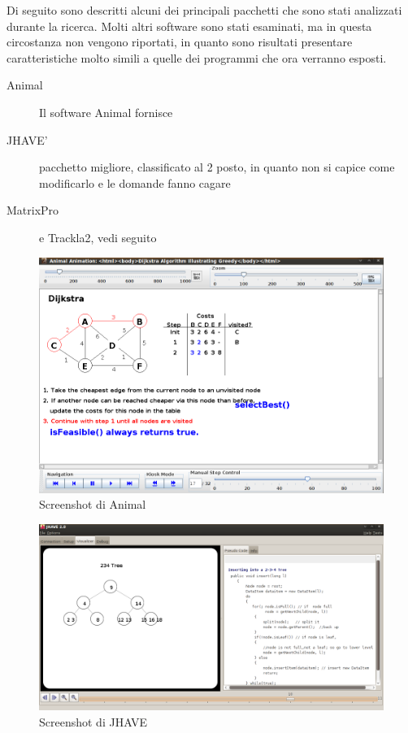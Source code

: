 Di seguito sono descritti alcuni dei principali pacchetti che sono
stati analizzati durante la ricerca. Molti altri software sono stati
esaminati, ma in questa circostanza non vengono riportati, in quanto
sono risultati presentare caratteristiche molto simili a quelle dei
programmi che ora verranno esposti. 
\begin{description}
\item [{{Animal}}] Il software Animal \cite{Animal} fornisce 
\item [{{JHAVE'}}] pacchetto migliore, classificato al 2 posto, in quanto
non si capice come modificarlo e le domande fanno cagare 
\item [{{MatrixPro}}] e Trackla2, vedi seguito 
\end{description}
\begin{figure}[htbp]
\centering
\includegraphics[scale=0.25]{images/Animal_screenshot.png}
\caption{Screenshot di Animal}
\end {figure}

\begin{figure}
\centering
\includegraphics[scale=0.25]{images/JHAVE_screenshot.png}
\caption{Screenshot di JHAVE}
\end{figure}

